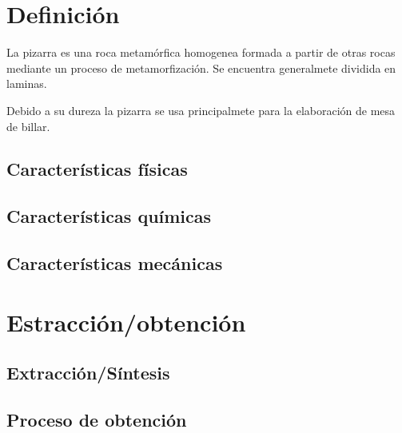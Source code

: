 \section {Definición}
	La pizarra es una roca metamórfica homogenea formada a partir de otras rocas mediante un proceso de metamorfización. Se encuentra generalmete dividida en laminas.
\par Debido a su dureza la pizarra se usa principalmete para la elaboración de mesa de billar.   
	\subsection {Características físicas}

	\subsection {Características químicas}

	\subsection {Características mecánicas}

\section {Estracción/obtención}

	\subsection {Extracción/Síntesis}

	\subsection {Proceso de obtención}
